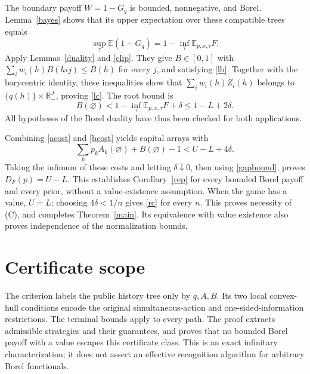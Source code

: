\documentclass[11pt,a4paper]{article}
\theoremstyle{definition}
\newcommand{\R}{\mathbb R}
\newcommand{\E}{\mathbb E}
\begin{document}
The boundary payoff $W=1-G_q$ is bounded, nonnegative, and Borel.
Lemma~\ref{bayes} shows that its upper expectation over these compatible
trees equals
\[
 \sup_\tau\E(1-G_q)=1-\inf_\tau\E_{p,x,\tau}F.
\]
Apply Lemmas~\ref{duality} and \ref{clip}. They give $B\in[0,1]$ with
$\sum_i w_i(h)B(hij)\leq B(h)$ for every $j$, and satisfying
\eqref{lb}. Together with the barycentric identity, these inequalities
show that $\sum_i w_i(h)Z_i(h)$ belongs to
$\{q(h)\}\times\R_-^J$, proving \eqref{lc}. The root bound is
\begin{equation}
 B(\varnothing)<1-\inf_\tau\E_{p,x,\tau}F+\delta
 \leq1-L+2\delta.
 \label{bcost}
\end{equation}
All hypotheses of the Borel duality have thus been checked for both
applications.

Combining \eqref{acost} and \eqref{bcost} yields capital arrays with
\[
 \sum_k p_k A_k(\varnothing)+B(\varnothing)-1
 <U-L+4\delta.
\]
Taking the infimum of these costs and letting $\delta\downarrow0$, then
using \eqref{gapbound}, proves
$D_F(p)=U-L$. This establishes Corollary~\ref{rep} for every bounded
Borel payoff and every prior, without a value-existence assumption.
When the game has a value, $U=L$; choosing $4\delta<1/n$ gives
\eqref{rc} for every $n$. This proves necessity of (C), and completes
Theorem~\ref{main}. Its equivalence with value existence also proves
independence of the normalization bounds.

\section{Certificate scope}
The criterion labels the public history tree only by $q,A,B$. Its two
local convex-hull conditions encode the original simultaneous-action
and one-sided-information restrictions. The terminal bounds apply to
every path. The proof extracts admissible strategies and their guarantees,
and proves that no bounded Borel payoff with a value escapes this
certificate class. This is an exact infinitary characterization; it does
not assert an effective recognition algorithm for arbitrary Borel
functionals.
\end{document}
